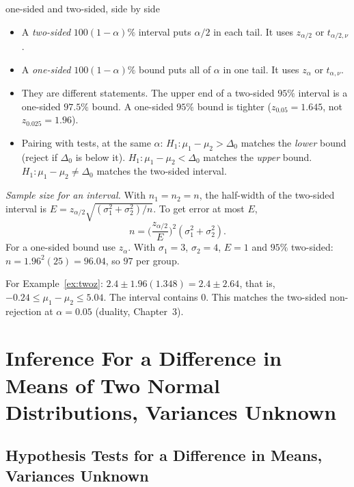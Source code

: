 \begin{nuance}{one-sided and two-sided, side by side}
\begin{itemize}
  \item A \emph{two-sided} $100(1-\alpha)\%$ interval puts $\alpha/2$ in each tail. It uses $z_{\alpha/2}$ or $t_{\alpha/2,\nu}$.
  \item A \emph{one-sided} $100(1-\alpha)\%$ bound puts all of $\alpha$ in one tail. It uses $z_\alpha$ or $t_{\alpha,\nu}$.
  \item They are different statements. The upper end of a two-sided $95\%$ interval is a one-sided $97.5\%$ bound. A one-sided $95\%$ bound is tighter ($z_{0.05}=1.645$, not $z_{0.025}=1.96$).
  \item Pairing with tests, at the same $\alpha$: $H_1:\mu_1-\mu_2>\Delta_0$ matches the \emph{lower} bound (reject if $\Delta_0$ is below it). $H_1:\mu_1-\mu_2<\Delta_0$ matches the \emph{upper} bound. $H_1:\mu_1-\mu_2\ne\Delta_0$ matches the two-sided interval.
\end{itemize}
\end{nuance}

\begin{example}\label{ex:twoz-ci-n}
\emph{Sample size for an interval.} With $n_1=n_2=n$, the half-width of the two-sided interval is $E=z_{\alpha/2}\sqrt{(\sigma_1^2+\sigma_2^2)/n}$. To get error at most $E$,
\[ n=\Big(\frac{z_{\alpha/2}}{E}\Big)^2(\sigma_1^2+\sigma_2^2). \]
For a one-sided bound use $z_\alpha$. With $\sigma_1=3$, $\sigma_2=4$, $E=1$ and $95\%$ two-sided: $n=1.96^2(25)=96.04$, so $97$ per group.
\end{example}

\begin{example}
For Example~\ref{ex:twoz}: $2.4\pm1.96(1.348)=2.4\pm2.64$, that is, $-0.24\le\mu_1-\mu_2\le5.04$. The interval contains $0$. This matches the two-sided non-rejection at $\alpha=0.05$ (duality, Chapter~3).
\end{example}

\section{Inference For a Difference in Means of Two Normal Distributions, Variances Unknown}

\subsection{Hypothesis Tests for a Difference in Means, Variances Unknown}

